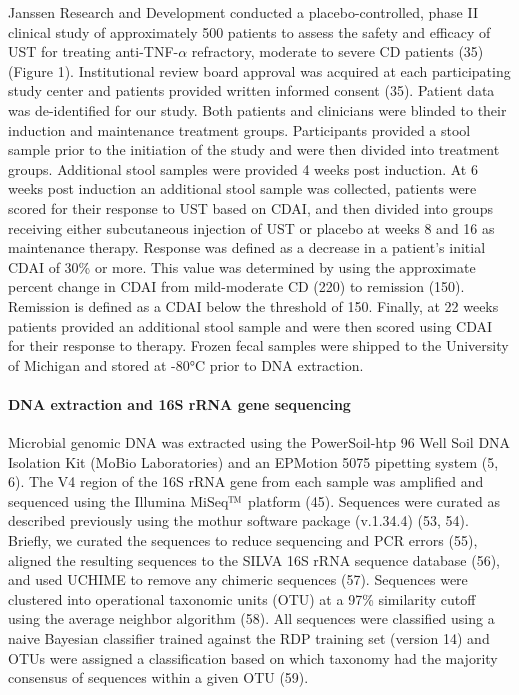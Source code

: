 \documentclass[12pt,]{article}
\let\oldparagraph\paragraph
\renewcommand{\paragraph}[1]{\oldparagraph{#1}\mbox{}}
\begin{document}
Janssen Research and Development conducted a placebo-controlled, phase
II clinical study of approximately 500 patients to assess the safety and
efficacy of UST for treating anti-TNF-\({\alpha}\) refractory, moderate
to severe CD patients (35) (Figure 1). Institutional review board
approval was acquired at each participating study center and patients
provided written informed consent (35). Patient data was de-identified
for our study. Both patients and clinicians were blinded to their
induction and maintenance treatment groups. Participants provided a
stool sample prior to the initiation of the study and were then divided
into treatment groups. Additional stool samples were provided 4 weeks
post induction. At 6 weeks post induction an additional stool sample was
collected, patients were scored for their response to UST based on CDAI,
and then divided into groups receiving either subcutaneous injection of
UST or placebo at weeks 8 and 16 as maintenance therapy. Response was
defined as a decrease in a patient's initial CDAI of 30\% or more. This
value was determined by using the approximate percent change in CDAI
from mild-moderate CD (220) to remission (150). Remission is defined as
a CDAI below the threshold of 150. Finally, at 22 weeks patients
provided an additional stool sample and were then scored using CDAI for
their response to therapy. Frozen fecal samples were shipped to the
University of Michigan and stored at -80°C prior to DNA extraction.

\paragraph{DNA extraction and 16S rRNA gene
sequencing}\label{dna-extraction-and-16s-rrna-gene-sequencing}

Microbial genomic DNA was extracted using the PowerSoil-htp 96 Well Soil
DNA Isolation Kit (MoBio Laboratories) and an EPMotion 5075 pipetting
system (5, 6). The V4 region of the 16S rRNA gene from each sample was
amplified and sequenced using the Illumina
MiSeq\(\text{\texttrademark}\) platform (45). Sequences were curated as
described previously using the mothur software package (v.1.34.4) (53,
54). Briefly, we curated the sequences to reduce sequencing and PCR
errors (55), aligned the resulting sequences to the SILVA 16S rRNA
sequence database (56), and used UCHIME to remove any chimeric sequences
(57). Sequences were clustered into operational taxonomic units (OTU) at
a 97\% similarity cutoff using the average neighbor algorithm (58). All
sequences were classified using a naive Bayesian classifier trained
against the RDP training set (version 14) and OTUs were assigned a
classification based on which taxonomy had the majority consensus of
sequences within a given OTU (59).
\end{document}
